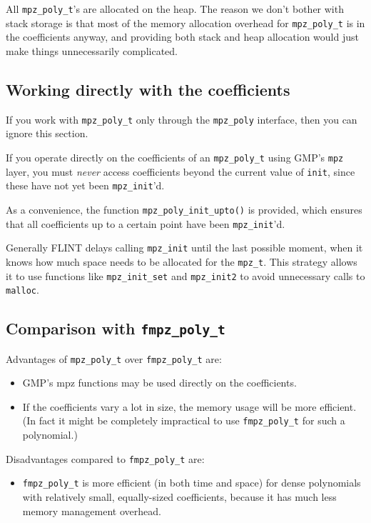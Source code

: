 \documentclass[a4paper,10pt]{article}
\newcommand{\code}{\lstinline}
\begin{document}
All \code{mpz_poly_t}'s are allocated on the heap. The reason we don't bother with stack storage is that most of the memory allocation overhead for \code{mpz_poly_t} is in the coefficients anyway, and providing both stack and heap allocation would just make things unnecessarily complicated.


\subsection{Working directly with the coefficients}

If you work with \code{mpz_poly_t} only through the \code{mpz_poly} interface, then you can ignore this section.

If you operate directly on the coefficients of an \code{mpz_poly_t} using GMP's \code{mpz} layer, you must \emph{never} access coefficients beyond the current value of \code{init}, since these have not yet been \code{mpz_init}'d.

As a convenience, the function \code{mpz_poly_init_upto()} is provided, which ensures that all coefficients up to a certain point have been \code{mpz_init}'d.

Generally FLINT delays calling \code{mpz_init} until the last possible moment, when it knows how much space needs to be allocated for the \code{mpz_t}. This strategy allows it to use functions like \code{mpz_init_set} and \code{mpz_init2} to avoid unnecessary calls to \code{malloc}.


\subsection{Comparison with \code{fmpz_poly_t}}

Advantages of \code{mpz_poly_t} over \code{fmpz_poly_t} are:
\begin{itemize}
\item GMP's mpz functions may be used directly on the coefficients.
\item If the coefficients vary a lot in size, the memory usage will be more efficient. (In fact it might be completely impractical to use \code{fmpz_poly_t} for such a polynomial.)
\end{itemize}

Disadvantages compared to \code{fmpz_poly_t} are:
\begin{itemize}
\item \code{fmpz_poly_t} is more efficient (in both time and space) for dense polynomials with relatively small, equally-sized coefficients, because it has much less memory management overhead.
\end{itemize}
\end{document}
